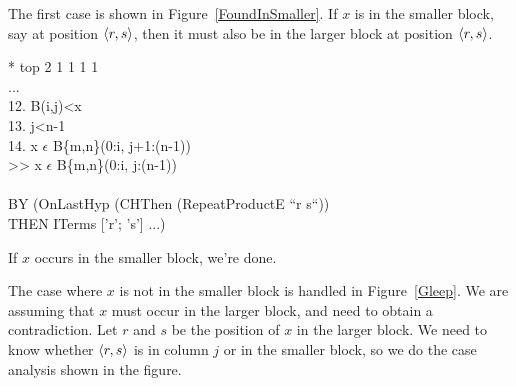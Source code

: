 The first case is shown in Figure~\ref{FoundInSmaller}.  If $x$ is in the
smaller block, say at
position $\langle r,s \rangle$, then it must also be in the larger block at
position $\langle r,s \rangle$.
\begin{RuledFigure}
\begin{Screen}{1}{\SnapshotSize}
\N{}* top 2 1 1 1 1 \\{}
\N{}... \\{}
\N{}12. B(i,j)<x \\{}
\N{}13. j<n-1 \\{}
\N{}14. x \(\epsilon{}\) B\{m,n\}(0:i, j+1:(n-1)) \\{}
\N{}>> x \(\epsilon{}\) B\{m,n\}(0:i, j:(n-1)) \\{}
\N{} \\{}
\N{}BY (OnLastHyp (CHThen (RepeatProductE ``r s``))  \\{}
\N{}    THEN ITerms ['r'; 's'] ...)    
\end{Screen}%
\caption{If $x$ occurs in the smaller block, we're done.}
\label{FoundInSmaller} 
\end{RuledFigure}%
The case where $x$ is not in the smaller block is handled in
Figure~\ref{Gleep}.  We are assuming that $x$ must occur in the larger block,
and need to obtain a contradiction.
Let $r$ and $s$ be
the position of $x$ in the larger block.  
We need to know whether $\langle r,s \rangle$ is
in column $j$ or in the smaller block, so we do the case analysis shown in 
the figure.
